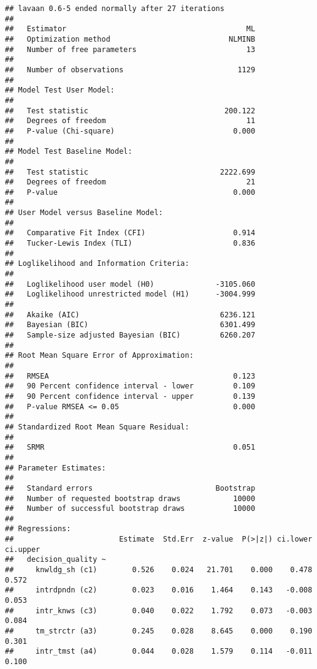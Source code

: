 \documentclass[]{article}
\begin{document}
\begin{verbatim}
## lavaan 0.6-5 ended normally after 27 iterations
## 
##   Estimator                                         ML
##   Optimization method                           NLMINB
##   Number of free parameters                         13
##                                                       
##   Number of observations                          1129
##                                                       
## Model Test User Model:
##                                                       
##   Test statistic                               200.122
##   Degrees of freedom                                11
##   P-value (Chi-square)                           0.000
## 
## Model Test Baseline Model:
## 
##   Test statistic                              2222.699
##   Degrees of freedom                                21
##   P-value                                        0.000
## 
## User Model versus Baseline Model:
## 
##   Comparative Fit Index (CFI)                    0.914
##   Tucker-Lewis Index (TLI)                       0.836
## 
## Loglikelihood and Information Criteria:
## 
##   Loglikelihood user model (H0)              -3105.060
##   Loglikelihood unrestricted model (H1)      -3004.999
##                                                       
##   Akaike (AIC)                                6236.121
##   Bayesian (BIC)                              6301.499
##   Sample-size adjusted Bayesian (BIC)         6260.207
## 
## Root Mean Square Error of Approximation:
## 
##   RMSEA                                          0.123
##   90 Percent confidence interval - lower         0.109
##   90 Percent confidence interval - upper         0.139
##   P-value RMSEA <= 0.05                          0.000
## 
## Standardized Root Mean Square Residual:
## 
##   SRMR                                           0.051
## 
## Parameter Estimates:
## 
##   Standard errors                            Bootstrap
##   Number of requested bootstrap draws            10000
##   Number of successful bootstrap draws           10000
## 
## Regressions:
##                        Estimate  Std.Err  z-value  P(>|z|) ci.lower ci.upper
##   decision_quality ~                                                        
##     knwldg_sh (c1)        0.526    0.024   21.701    0.000    0.478    0.572
##     intrdpndn (c2)        0.023    0.016    1.464    0.143   -0.008    0.053
##     intr_knws (c3)        0.040    0.022    1.792    0.073   -0.003    0.084
##     tm_strctr (a3)        0.245    0.028    8.645    0.000    0.190    0.301
##     intr_tmst (a4)        0.044    0.028    1.579    0.114   -0.011    0.100

\end{verbatim}
\end{document}
